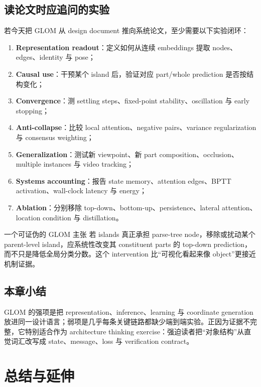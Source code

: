 \documentclass[a4paper]{article}
\begin{document}
\subsection{读论文时应追问的实验}

若今天把 GLOM 从 design document 推向系统论文，至少需要以下实验闭环：

\begin{enumerate}
  \item \textbf{Representation readout}：定义如何从连续 embeddings 提取 nodes、edges、identity 与 pose；
  \item \textbf{Causal use}：干预某个 island 后，验证对应 part/whole prediction 是否按结构变化；
  \item \textbf{Convergence}：测 settling steps、fixed-point stability、oscillation 与 early stopping；
  \item \textbf{Anti-collapse}：比较 local attention、negative pairs、variance regularization 与 consensus weighting；
  \item \textbf{Generalization}：测试新 viewpoint、新 part composition、occlusion、multiple instances 与 video tracking；
  \item \textbf{Systems accounting}：报告 state memory、attention edges、BPTT activation、wall-clock latency 与 energy；
  \item \textbf{Ablation}：分别移除 top-down、bottom-up、persistence、lateral attention、location condition 与 distillation。
\end{enumerate}

\begin{importantbox}{一个可证伪的 GLOM 主张}
若 islands 真正承担 parse-tree node，移除或扰动某个 parent-level island，应系统性改变其 constituent parts 的 top-down prediction，而不只是降低全局分类分数。这个 intervention 比“可视化看起来像 object”更接近机制证据。
\end{importantbox}

\subsection{本章小结}

GLOM 的强项是把 representation、inference、learning 与 coordinate generation 放进同一设计语言；弱项是几乎每条关键链路都缺少端到端实验。正因为证据不完整，它特别适合作为 architecture thinking exercise：强迫读者把“对象结构”从直觉词汇改写成 state、message、loss 与 verification contract。

\section{总结与延伸}
\end{document}
